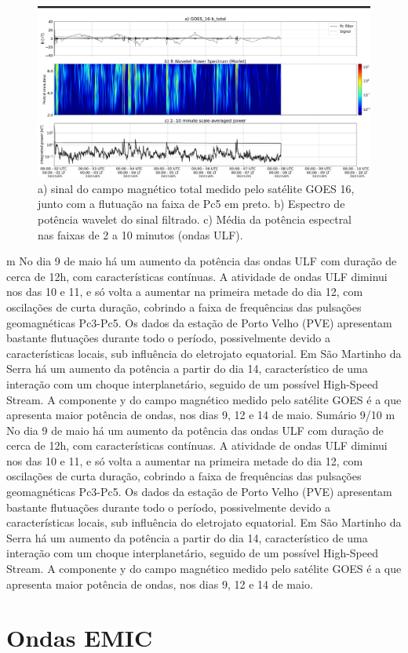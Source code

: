 \documentclass[a4paper, 10pt]{article}
\begin{document}
                     \begin{figure}[H]
    
                        \centering
   
                             \includegraphics[width=14cm]{./figures//figureULF_2.png}

                             \caption{a) sinal do campo magnético total medido pelo 
                              satélite GOES 16, junto com a flutuação na faixa de Pc5 
                              em preto. b) Espectro de potência wavelet do sinal 
                              filtrado. c) Média da potência espectral nas faixas 
                              de 2 a 10 minutos (ondas ULF).}
                        \end{figure}

                     m No dia 9 de maio há um aumento da potência das ondas ULF com
duração de cerca de 12h, com características contínuas. A atividade de
ondas ULF diminui nos das 10 e 11, e só volta a aumentar na primeira
metade do dia 12, com oscilações de curta duração, cobrindo a faixa de
frequências das pulsações geomagnéticas Pc3-Pc5. Os dados da estação de
Porto Velho (PVE) apresentam bastante flutuações durante todo o período,
possivelmente devido a características locais, sub influência do eletrojato
equatorial. Em São Martinho da Serra há um aumento da potência a partir
do dia 14, característico de uma interação com um choque interplanetário,
seguido de um possível High-Speed Stream. A componente y do campo
magnético medido pelo satélite GOES é a que apresenta maior potência de
ondas, nos dias 9, 12 e 14 de maio.
Sumário
9/10
m No dia 9 de maio há um aumento da potência das ondas ULF com duração de cerca de 12h, com características contínuas. A atividade de ondas ULF diminui nos das 10 e 11, e só volta a aumentar na primeira metade do dia 12, com oscilações de curta duração, cobrindo a faixa de frequências das pulsações geomagnéticas Pc3-Pc5. Os dados da estação de Porto Velho (PVE) apresentam bastante flutuações durante todo o período, possivelmente devido a características locais, sub influência do eletrojato equatorial. Em São Martinho da Serra há um aumento da potência a partir do dia 14, característico de uma interação com um choque interplanetário, seguido de um possível High-Speed Stream. A componente y do campo magnético medido pelo satélite GOES é a que apresenta maior potência de ondas, nos dias 9, 12 e 14 de maio.\section{Ondas EMIC} 
\end{document}
